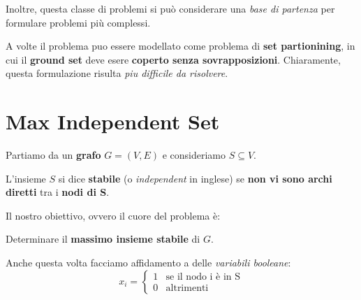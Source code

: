 Inoltre, questa classe di problemi si può considerare una \textit{base di partenza}
per formulare problemi più complessi.

\begin{remark}
    A volte il problema puo essere modellato come
    problema di \textbf{set partionining}, in cui il
    \textbf{ground set} deve esere \textbf{coperto senza sovrapposizioni}.
    Chiaramente, questa formulazione risulta \textit{piu difficile da risolvere}.
\end{remark}

\section{Max Independent Set}

Partiamo da un \textbf{grafo} $G=(V,E)$ e consideriamo $S\subseteq V$.

\begin{definition}
    L'insieme $S$ si dice \textbf{stabile} (o \textit{independent} in inglese) 
    se \textbf{non vi sono archi diretti} tra i \textbf{nodi di S}.
\end{definition}

Il nostro obiettivo, ovvero il cuore del problema è:

\begin{exa}
    Determinare il \textbf{massimo insieme stabile} di $G$.
\end{exa}

Anche questa volta facciamo affidamento a delle \textit{variabili booleane}:
\[
    x_i = \begin{cases}
        1 & \text{se il nodo i è in S} \\ 
        0 & \text{altrimenti}
    \end{cases}
\]

